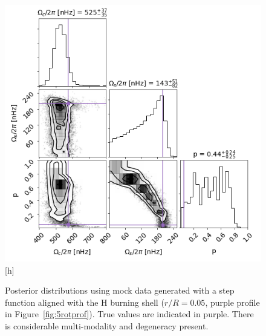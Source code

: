 \begin{figure}
\centering
    \includegraphics[width=\textwidth]{Figures/subgiant_chapter_figures/10.05_corner.png}[h]
    \caption{
    Posterior distributions using mock data generated with a step function aligned with the H burning shell ($r/R = 0.05$, purple profile in Figure~\ref{fig:5rotprof}). True values are indicated in purple. There is considerable multi-modality and degeneracy present.}
    \label{fig:mock_posterior_005_uniform}
\end{figure}



